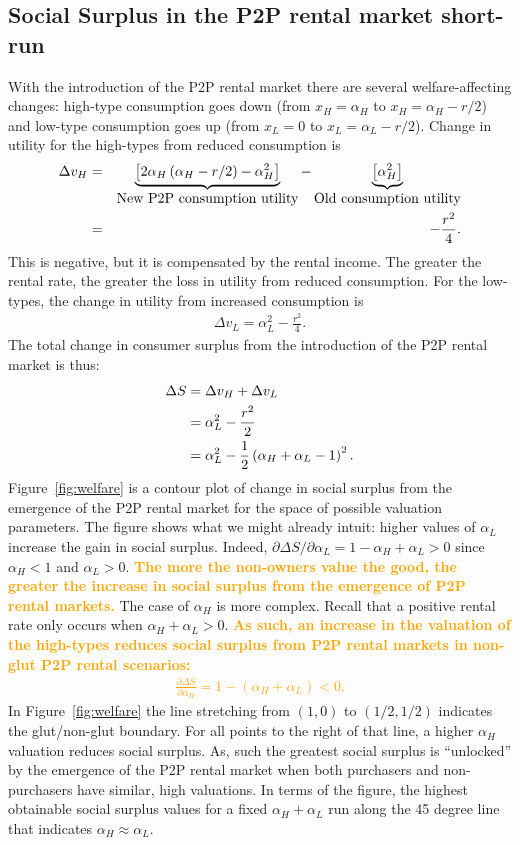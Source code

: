 \documentclass[11pt]{article}
\newcommand{\important}[1]{\textcolor{orange}{\textbf{#1}}}
\newcommand{\important}[1]{#1}
\begin{document}
\subsection{Social Surplus in the P2P rental market short-run} 
With the introduction of the P2P rental market there are several welfare-affecting changes: 
high-type consumption goes down (from $x_H = \alpha_H$ to  $x_H = \alpha_H - r/2$) and low-type consumption goes up (from $x_L = 0$ to $x_L = \alpha_L - r/2$). 
Change in utility for the high-types from reduced consumption is 
\begin{eqnarray}
\Delta v_H &=& \underbrace{\left[2 \alpha_H \left(\alpha_H - r/2\right) - \alpha_H^2 \right]}_{\mbox{New P2P consumption utility}} - 
                             \underbrace{\left[\alpha_H^2 \right]}_{\mbox{Old consumption utility}}   \notag \\
           &=& - \frac{r^2}{4}. 
\end{eqnarray} 
This is negative, but it is compensated by the rental income. 
The greater the rental rate, the greater the loss in utility from reduced consumption. 
For the low-types, the change in utility from increased consumption is
\begin{align}
\Delta v_L = \alpha_L^2 - \frac{r^2}{4}. 
\end{align} 
The total change in consumer surplus from the introduction of the P2P rental market is thus: 
\begin{align}
\Delta S &= \Delta v_H + \Delta v_L \notag \\ 
         &=  \alpha_L^2 - \frac{r^2}{2} \notag \\
         &= \alpha_L^2 - \frac{1}{2} \left( \alpha_H + \alpha_L -1 \right)^2.
\end{align} 
Figure~\ref{fig:welfare} is a contour plot of change in social surplus from the emergence of the P2P rental market for the space of possible valuation parameters.
The figure shows what we might already intuit: higher values of $\alpha_L$ increase the gain in social surplus.
Indeed, $\partial \Delta S/\partial \alpha_L = 1 - \alpha_H + \alpha_L > 0$ since $\alpha_H < 1$ and $\alpha_L > 0$. 
\important{The more the non-owners value the good, the greater the increase in social surplus from the emergence of P2P rental markets.} 
The case of $\alpha_H$ is more complex. 
Recall that a positive rental rate only occurs when $\alpha_H + \alpha_L > 0$.
\important{As such, an increase in the valuation of the high-types reduces social surplus from P2P rental markets in non-glut P2P rental scenarios:   
\begin{align} 
\frac{\partial \Delta S}{\partial \alpha_H} =  1 - (\alpha_H + \alpha_L) < 0.
\end{align}} 
In Figure~\ref{fig:welfare} the line stretching from $(1,0)$ to $(1/2, 1/2)$ indicates the glut/non-glut boundary. 
For all points to the right of that line, a higher $\alpha_H$ valuation reduces social surplus.  
As, such the greatest social surplus is ``unlocked'' by the emergence of the P2P rental market when both purchasers and non-purchasers have similar, high valuations. 
In terms of the figure, the highest obtainable social surplus values for a fixed $\alpha_H + \alpha_L$ run along the 45 degree line that indicates $\alpha_H \approx \alpha_L$. 
\end{document}
